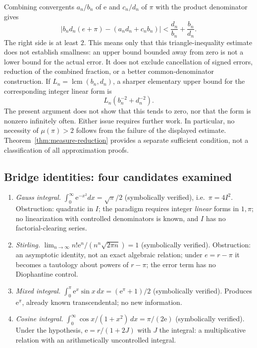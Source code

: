 \documentclass[11pt]{amsart}
\theoremstyle{definition}
\theoremstyle{remark}
\numberwithin{equation}{section}
\newcommand{\irr}{\mu}
\newcommand{\ee}{\mathrm{e}}
\begin{document}
Combining convergents $a_n/b_n$ of $\ee$ and $c_n/d_n$ of $\pi$ with the product denominator gives
\[
\left|b_nd_n(e+\pi)-(a_nd_n+c_nb_n)\right|
<\frac{d_n}{b_n}+\frac{b_n}{d_n}.
\]
The right side is at least $2$. This means only that this triangle-inequality estimate does not establish smallness: an upper bound bounded away from zero is not a lower bound for the actual error. It does not exclude cancellation of signed errors, reduction of the combined fraction, or a better common-denominator construction. If $L_n=\operatorname{lcm}(b_n,d_n)$, a sharper elementary upper bound for the corresponding integer linear form is
\[
L_n\left(b_n^{-2}+d_n^{-2}\right).
\]
The present argument does not show that this tends to zero, nor that the form is nonzero infinitely often. Either issue requires further work. In particular, no necessity of $\irr(\pi)>2$ follows from the failure of the displayed estimate. Theorem~\ref{thm:measure-reduction} provides a separate sufficient condition, not a classification of all approximation proofs.

\subsection{Bridge identities: four candidates examined}

\begin{enumerate}
\item \emph{Gauss integral.} $\int_0^\infty \ee^{-x^2}dx=\sqrt\pi/2$ (symbolically verified), i.e.\ $\pi=4I^2$. Obstruction: quadratic in $I$; the paradigm requires integer \emph{linear} forms in $1,\pi$; no linearization with controlled denominators is known, and $I$ has no factorial-clearing series.
\item \emph{Stirling.} $\lim_{n\to\infty}n!\ee^n/(n^n\sqrt{2\pi n})=1$ (symbolically verified). Obstruction: an asymptotic identity, not an exact algebraic relation; under $e=r-\pi$ it becomes a tautology about powers of $r-\pi$; the error term has no Diophantine control.
\item \emph{Mixed integral.} $\int_0^\pi \ee^x\sin x\,dx=(\ee^\pi+1)/2$ (symbolically verified). Produces $\ee^\pi$, already known transcendental; no new information.
\item \emph{Cosine integral.} $\int_0^\infty\cos x/(1+x^2)\,dx=\pi/(2\ee)$ (symbolically verified). Under the hypothesis, $\ee=r/(1+2J)$ with $J$ the integral: a multiplicative relation with an arithmetically uncontrolled integral.
\end{enumerate}
\end{document}
